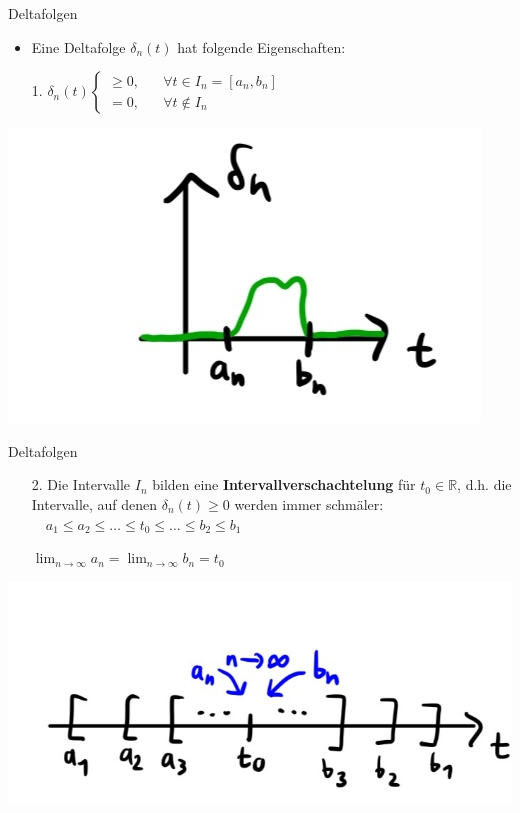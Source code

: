 \documentclass[14pt, aspectratio=169, handout]{beamer}
\begin{document}
\begin{frame}{Deltafolgen}
    \begin{itemize}
        \item Eine Deltafolge $\delta_n(t)$ hat folgende Eigenschaften:
        \item[] 
        \item[1.]  $\delta_n(t) \begin{cases}
        \geq 0, \hspace{20pt} \forall t \in I_n = [a_n, b_n]\\
        = 0, \hspace{20pt} \forall t \notin I_n
        \end{cases}$
    \end{itemize}
    \begin{center}
        \includegraphics[width=0.4\linewidth]{figures/Deltafolge_3.jpg}
    \end{center}
\end{frame}

\begin{frame}{Deltafolgen}
    \begin{itemize}
        \item[2.] Die Intervalle $I_n$ bilden eine \textbf{Intervallverschachtelung} für $t_0 \in \mathbb{R}$, d.h. die Intervalle, auf denen $\delta_n(t) \geq 0$ werden immer schmäler: $ \hspace{12pt} a_1 \leq a_2 \leq \dots \leq t_0 \leq \dots \leq b_2 \leq b_1$
        \item[] 
        \item[] $\displaystyle\lim_{n \to \infty}a_n = \displaystyle\lim_{n \to \infty}b_n = t_0$
    \end{itemize}
    \begin{center}
        \includegraphics[width=0.6\linewidth]{figures/Deltafolge_4.jpg}
    \end{center}
\end{frame}
\end{document}
